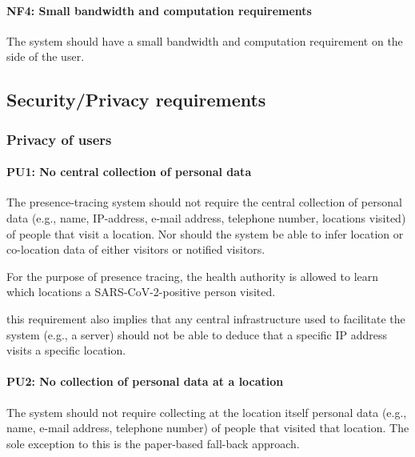 \paragraph{NF4: Small bandwidth and computation requirements} The system should have a small bandwidth and computation requirement on the side of the user.

\subsection{Security/Privacy requirements}

\subsubsection{Privacy of users}

\paragraph{PU1: No central collection of personal data} The presence-tracing system should not require the central collection of personal data (e.g., name, IP-address, e-mail address, telephone number, locations visited) of people that visit a location. Nor should the system be able to infer location or co-location data of either visitors or notified visitors.

For the purpose of presence tracing, the health authority is allowed to learn which locations a SARS-CoV-2-positive person visited. 

 this requirement also implies that any central infrastructure used to facilitate the system (e.g., a server) should not be able to deduce that a specific IP address visits a specific location. 

\paragraph{PU2: No collection of personal data at a location} The system should not require collecting at the location itself personal data (e.g., name, e-mail address, telephone number) of people that visited that location. The sole exception to this is the paper-based fall-back approach.

